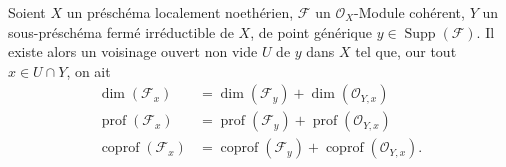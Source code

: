 \begin{proposition}[6.10.6]
\label{IV.2.s6.10.6-fr}
Soient $X$ un préschéma localement noethérien, $\mathcal F$ un
$\mathcal O_X$-Module cohérent, $Y$ un sous-préschéma fermé irréductible de
$X$, de point générique $y\in\operatorname{Supp}(\mathcal F)$. Il existe
alors un voisinage ouvert non vide $U$ de $y$ dans $X$ tel que, our tout
$x\in U\cap Y$, on ait
\begin{align}
\dim(\mathcal F_x)&=\dim(\mathcal F_y)+\dim(\mathcal O_{Y,x})
\tag{6.10.6.1}\label{IV.2.s6.10.6.1-fr}\\
\operatorname{prof}(\mathcal F_x)&=\operatorname{prof}(\mathcal F_y)+
\operatorname{prof}(\mathcal O_{Y,x})
\tag{6.10.6.2}\label{IV.2.s6.10.6.2-fr}\\
\operatorname{coprof}(\mathcal F_x)&=\operatorname{coprof}(\mathcal F_y)+
\operatorname{coprof}(\mathcal O_{Y,x}).
\tag{6.10.6.3}\label{IV.2.s6.10.6.3-fr}
\end{align}
\end{proposition}

